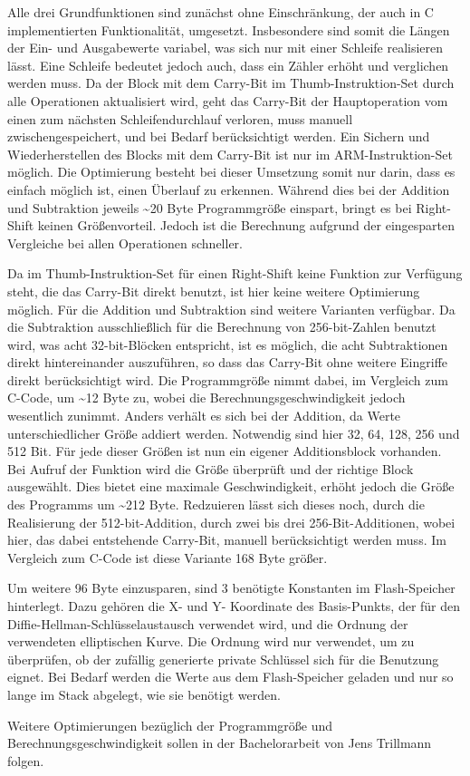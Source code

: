 Alle drei Grundfunktionen sind zunächst ohne Einschränkung, der auch in C implementierten Funktionalität, umgesetzt. Insbesondere sind somit
die Längen der Ein- und Ausgabewerte variabel, was sich nur mit einer Schleife realisieren lässt. Eine Schleife bedeutet jedoch auch, dass
ein Zähler erhöht und verglichen werden muss. Da der Block mit dem Carry-Bit im Thumb-Instruktion-Set durch alle Operationen aktualisiert wird,
geht das Carry-Bit der Hauptoperation vom einen zum nächsten Schleifendurchlauf verloren, muss manuell zwischengespeichert, und bei Bedarf
berücksichtigt werden. Ein Sichern und Wiederherstellen des Blocks mit dem Carry-Bit ist nur im ARM-Instruktion-Set möglich.
Die Optimierung besteht bei dieser Umsetzung somit nur darin, dass es einfach möglich ist, einen Überlauf zu erkennen.
Während dies bei der Addition und Subtraktion jeweils \textasciitilde 20 Byte Programmgröße einspart, bringt es bei Right-Shift
keinen Größenvorteil. Jedoch ist die Berechnung aufgrund der eingesparten Vergleiche bei allen Operationen schneller.

Da im Thumb-Instruktion-Set für einen Right-Shift keine Funktion zur Verfügung steht, die das Carry-Bit direkt benutzt, ist hier keine weitere Optimierung möglich.
Für die Addition und Subtraktion sind weitere Varianten verfügbar. Da die Subtraktion ausschließlich für die Berechnung von 256-bit-Zahlen benutzt wird,
was acht 32-bit-Blöcken entspricht, ist es möglich, die acht Subtraktionen direkt hintereinander auszuführen, so dass das Carry-Bit ohne weitere
Eingriffe direkt berücksichtigt wird. Die Programmgröße nimmt dabei, im Vergleich zum C-Code, um \textasciitilde 12 Byte zu, wobei die
Berechnungsgeschwindigkeit jedoch wesentlich zunimmt. Anders verhält es sich bei der Addition, da Werte unterschiedlicher Größe addiert werden.
Notwendig sind hier 32, 64, 128, 256 und 512 Bit. Für jede dieser Größen ist nun ein eigener Additionsblock vorhanden. Bei Aufruf der Funktion wird
die Größe überprüft und der richtige Block ausgewählt. Dies bietet eine maximale Geschwindigkeit, erhöht jedoch die Größe des Programms um \textasciitilde 212 Byte.
Redzuieren lässt sich dieses noch, durch die Realisierung der 512-bit-Addition, durch zwei bis drei 256-Bit-Additionen, wobei hier, das dabei entstehende
Carry-Bit, manuell berücksichtigt werden muss. Im Vergleich zum C-Code ist diese Variante 168 Byte größer.

Um weitere 96 Byte einzusparen, sind 3 benötigte Konstanten im Flash-Speicher hinterlegt. Dazu gehören die X- und Y- Koordinate des Basis-Punkts, der für
den Diffie-Hellman-Schlüsselaustausch verwendet wird, und die Ordnung der verwendeten elliptischen Kurve. Die Ordnung wird nur verwendet, um zu überprüfen,
ob der zufällig generierte private Schlüssel sich für die Benutzung eignet. Bei Bedarf werden die Werte aus dem Flash-Speicher geladen und nur so lange
im Stack abgelegt, wie sie benötigt werden.

Weitere Optimierungen bezüglich der Programmgröße und Berechnungsgeschwindigkeit sollen in der Bachelorarbeit von Jens Trillmann folgen.